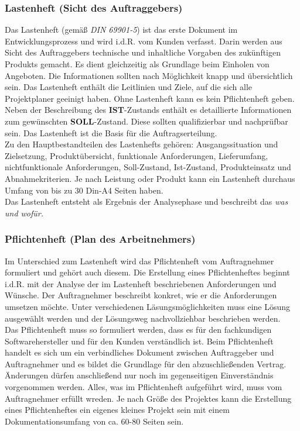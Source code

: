 \documentclass[a4paper, 12pt]{report}
\begin{document}
\subsubsection{Lastenheft (Sicht des Auftraggebers)}

Das Lastenheft (gemäß \emph{DIN 69901-5}) ist das erste Dokument im 
Entwicklungsprozess und wird i.d.R. vom Kunden verfasst. Darin werden aus Sicht 
des Auftraggebers technische und inhaltliche Vorgaben des zukünftigen Produkts 
gemacht. Es dient gleichzeitig als Grundlage beim Einholen von Angeboten. Die 
Informationen sollten nach Möglichkeit knapp und übersichtlich sein. Das 
Lastenheft enthält die Leitlinien und Ziele, auf die sich alle Projektplaner 
geeinigt haben. Ohne Lastenheft kann es kein Pflichtenheft geben. Neben der 
Beschreibung des \textbf{IST}-Zustands enthält es detaillierte Informationen zum 
gewünschten \textbf{SOLL}-Zustand. Diese sollten qualifizierbar und nachprüfbar 
sein. Das Lastenheft ist die Basis für die Auftragserteilung. \\

Zu den Hauptbestandteilen des Lastenhefts gehören: Ausgangssituation und 
Zielsetzung, Produktübersicht, funktionale Anforderungen, Lieferumfang, 
nichtfunktionale Anforderungen, Soll-Zustand, Ist-Zustand, Produkteinsatz und
Abnahmekriterien. Je nach Leistung oder Produkt kann ein Lastenheft durchaus 
Umfang von bis zu 30 Din-A4 Seiten haben. \\

Das Lastenheft entsteht als Ergebnis der Analysephase und beschreibt das \emph{
was und wofür.}

\subsubsection{Pflichtenheft (Plan des Arbeitnehmers)}

Im Unterschied zum Lastenheft wird das Pflichtenheft vom Auftragnehmer 
formuliert und gehört auch diesem. Die Erstellung eines Pflichtenheftes beginnt 
i.d.R. mit der Analyse der im Lastenheft beschriebenen Anforderungen und 
Wünsche. Der Auftragnehmer beschreibt konkret, wie er die Anforderungen umsetzen
möchte. Unter verschiedenen Läsungsmöglichkeiten muss eine Lösung ausgewählt 
werden und der Lösungsweg nachvollziehbar beschrieben werden. \\

Das Pflichtenheft muss so formuliert werden, dass es für den fachkundigen 
Softwarehersteller und für den Kunden verständlich ist. Beim Pflichtenheft 
handelt es sich um ein verbindliches Dokument zwischen Auftraggeber und 
Auftragnehmer und es bildet die Grundlage für den abzuschließenden Vertrag. 
Änderungen dürfen anschließend nur noch im gegenseitigen Einverständnis 
vorgenommen werden. Alles, was im Pflichtenheft aufgeführt wird, muss vom 
Auftragnehmer erfüllt wreden. Je nach Größe des Projektes kann die Erstellung 
eines Pflichtenheftes ein eigenes kleines Projekt sein mit einem 
Dokumentationsumfang von ca. 60-80 Seiten sein. \\
\end{document}
